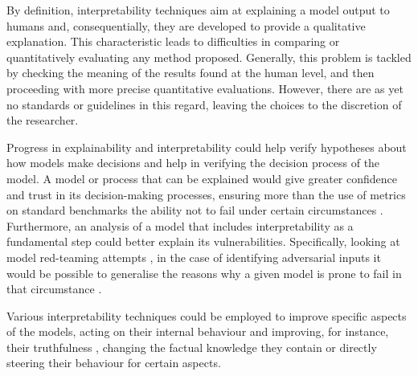 By definition, interpretability techniques aim at explaining a model output to humans \citep{MILLER20191} and, consequentially, they are developed to provide a qualitative explanation. This characteristic leads to difficulties in comparing or quantitatively evaluating any method proposed. Generally, this problem is tackled by checking the meaning of the results found at the human level, and then proceeding with more precise quantitative evaluations. However, there are as yet no standards or guidelines in this regard, leaving the choices to the discretion of the researcher.

Progress in explainability and interpretability could help verify hypotheses about how models make decisions \citep{geiger2023causal} and help in verifying the decision process of the model. A model or process that can be explained would give greater confidence and trust in its decision-making processes, ensuring more than the use of metrics on standard benchmarks the ability not to fail under certain circumstances \citep{jacovi2021formalizing}. Furthermore, an analysis of a model that includes interpretability as a fundamental step could better explain its vulnerabilities. Specifically, looking at model red-teaming attempts \citep{ziegler2022adversarial}, in the case of identifying adversarial inputs it would be possible to generalise the reasons why a given model is prone to fail in that circumstance \citep{rastogi2023supporting, räuker2023transparent}.

Various interpretability techniques could be employed to improve specific aspects of the models, acting on their internal behaviour and improving, for instance, their truthfulness \citep{li2023inferencetime}, changing the factual knowledge they contain \citep{meng2023locating, hernandez2023inspecting} or directly steering their behaviour for certain aspects.

